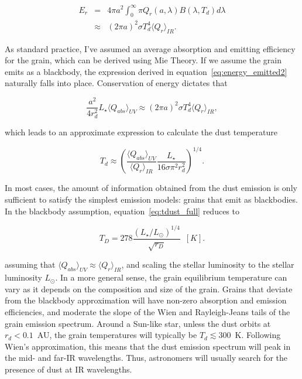     \begin{eqnarray}
    E_{r} &=& 4\pi a^2 \int_0^\infty \pi Q_{r}(a,\lambda) B(\lambda,T_d)  d\lambda \label{eq:energy_emitted1}\\
          & \approx & \left(2\pi a\right)^2 \sigma T_d^4 \langle Q_{r}\rangle_{IR}. \label{eq:energy_emitted2}
    \end{eqnarray}
            
    
    \noindent As standard practice, I've assumed an average absorption and emitting efficiency for the grain, which can be derived using Mie Theory. If we assume the grain emits as a blackbody, the expression derived in equation~\ref{eq:energy_emitted2} naturally falls into place. Conservation of energy dictates that
            
            
    \begin{equation}\label{eq:conserve_energy} 
     \frac{a^2}{4r_d^2}L_\star \langle Q_{abs}\rangle_{UV} \approx \left(2\pi a\right)^2 \sigma T_d^4 \langle Q_{r}\rangle_{IR},
    \end{equation}
            
    \noindent which leads to an approximate expression to calculate the dust temperature
    
    \begin{equation}\label{eq:tdust_full}
    T_d \approx \left(\frac{\langle Q_{abs} \rangle_{UV}}{\langle Q_{r}\rangle_{IR}} \frac{L_\star}{16\sigma \pi^2 r_d^2}\right)^{1/4}.
    \end{equation}
        
    In most cases, the amount of information obtained from the dust emission is only sufficient to satisfy the simplest emission models: grains that emit as blackbodies. In the blackbody assumption, equation~\ref{eq:tdust_full} reduces to 
            
    \begin{equation}\label{eq:blackbody_temp}
            T_D = 278 \frac{\left(L_\star/L_\odot \right)^{1/4}}{\sqrt{r_D}}\enspace [K]. 
    \end{equation}
    
    \noindent assuming that $\langle Q_{abs} \rangle_{UV} \approx \langle Q_{r}\rangle_{IR}$, and scaling the stellar luminosity to the stellar luminosity $L_\odot$. In a more general sense, the grain equilibrium temperature can vary as it depends on the composition and size of the grain\citep{Draine2003}. Grains that deviate from the blackbody approximation will have non-zero absorption and emission efficiencies, and moderate the slope of the Wien and Rayleigh-Jeans tails of the grain emission spectrum. Around a Sun-like star, unless the dust orbits at $r_d<0.1$~AU, the grain temperatures will typically be $T_d \lesssim 300$~K. Following Wien's approximation, this means that the dust emission spectrum will peak in the mid- and far-IR wavelengths. Thus, astronomers will usually search for the presence of dust at IR wavelengths. 

